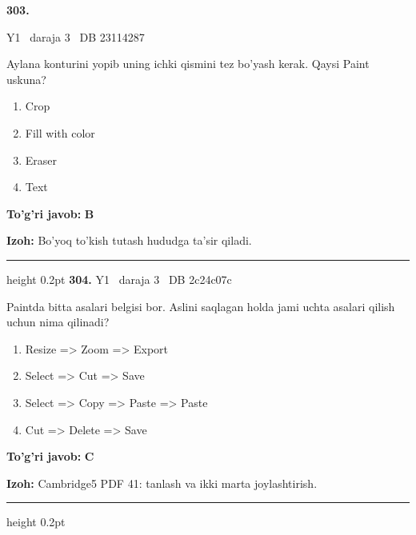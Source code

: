 \documentclass[10pt,a4paper,oneside]{article}
\begin{document}
\hypertarget{q303}{\textbf{\color{ink}303.}}  {\color{muted}\scriptsize Y1 \textbullet\ daraja 3 \textbullet\ DB 23114287}
\par
Aylana konturini yopib uning ichki qismini tez bo'yash kerak. Qaysi Paint uskuna?
\begin{enumerate}[label=\Alph*),leftmargin=9mm]
\item Crop
\item Fill with color
\item Eraser
\item Text
\end{enumerate}
\begin{tcolorbox}[enhanced,breakable,colback=teal!4,colframe=teal!45!black,boxrule=0.45pt,arc=1.2mm,left=2.8mm,right=2.8mm,top=2mm,bottom=2mm,before skip=2mm,after skip=2mm]
\textbf{\color{teal}To'g'ri javob:} \textbf{B}
\par\smallskip
\textbf{Izoh:} Bo'yoq to'kish tutash hududga ta'sir qiladi.
\end{tcolorbox}
\vspace{2mm}\hrule height 0.2pt \vspace{4mm}
\hypertarget{q304}{\textbf{\color{ink}304.}}  {\color{muted}\scriptsize Y1 \textbullet\ daraja 3 \textbullet\ DB 2c24c07c}
\par
Paintda bitta asalari belgisi bor. Aslini saqlagan holda jami uchta asalari qilish uchun nima qilinadi?
\begin{enumerate}[label=\Alph*),leftmargin=9mm]
\item Resize =\textgreater{} Zoom =\textgreater{} Export
\item Select =\textgreater{} Cut =\textgreater{} Save
\item Select =\textgreater{} Copy =\textgreater{} Paste =\textgreater{} Paste
\item Cut =\textgreater{} Delete =\textgreater{} Save
\end{enumerate}
\begin{tcolorbox}[enhanced,breakable,colback=teal!4,colframe=teal!45!black,boxrule=0.45pt,arc=1.2mm,left=2.8mm,right=2.8mm,top=2mm,bottom=2mm,before skip=2mm,after skip=2mm]
\textbf{\color{teal}To'g'ri javob:} \textbf{C}
\par\smallskip
\textbf{Izoh:} Cambridge5 PDF 41: tanlash va ikki marta joylashtirish.
\end{tcolorbox}
\vspace{2mm}\hrule height 0.2pt \vspace{4mm}
\end{document}
